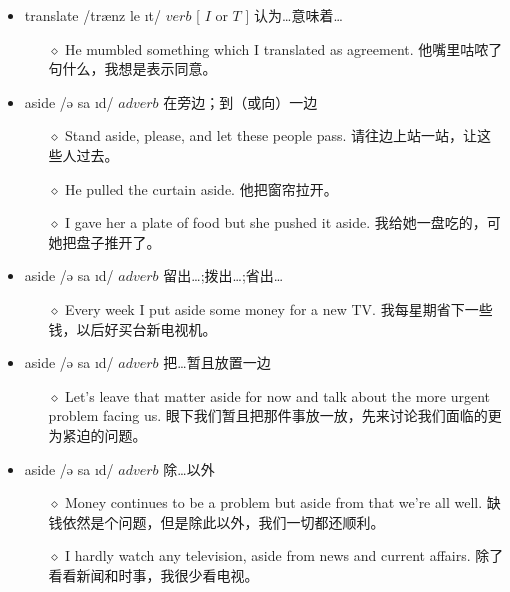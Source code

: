 \documentclass[a4paper,top=2.5cm,buttom=2.5cm10.5pt]{book}
\begin{document}
\begin{itemize}
\item translate /trænz \textprimstress le \i t/ $ verb $ [  $ I $  or  $ T $  ] 认为…意味着…
\begin{itemize}
\item[$\diamond$] He mumbled something which I translated as agreement.
他嘴里咕哝了句什么，我想是表示同意。
\end{itemize}
\end{itemize}
\begin{itemize}
\item aside /ə \textprimstress sa \i d/ $ adverb $  在旁边；到（或向）一边
\begin{itemize}
\item[$\diamond$] Stand aside, please, and let these people pass.
请往边上站一站，让这些人过去。
\item[$\diamond$] He pulled the curtain aside.
他把窗帘拉开。
\item[$\diamond$] I gave her a plate of food but she pushed it aside.
我给她一盘吃的，可她把盘子推开了。
\end{itemize}
\end{itemize}
\begin{itemize}
\item aside /ə \textprimstress sa \i d/ $ adverb $  留出…;拨出…;省出…
\begin{itemize}
\item[$\diamond$] Every week I put aside some money for a new TV.
我每星期省下一些钱，以后好买台新电视机。
\end{itemize}
\end{itemize}
\begin{itemize}
\item aside /ə \textprimstress sa \i d/ $ adverb $  把…暂且放置一边
\begin{itemize}
\item[$\diamond$] Let's leave that matter aside for now and talk about the more urgent problem facing us.
眼下我们暂且把那件事放一放，先来讨论我们面临的更为紧迫的问题。
\end{itemize}
\end{itemize}
\begin{itemize}
\item aside /ə \textprimstress sa \i d/ $ adverb $  除…以外
\begin{itemize}
\item[$\diamond$] Money continues to be a problem but aside from that we're all well.
缺钱依然是个问题，但是除此以外，我们一切都还顺利。
\item[$\diamond$] I hardly watch any television, aside from news and current affairs.
除了看看新闻和时事，我很少看电视。
\end{itemize}
\end{itemize}
\end{document}

